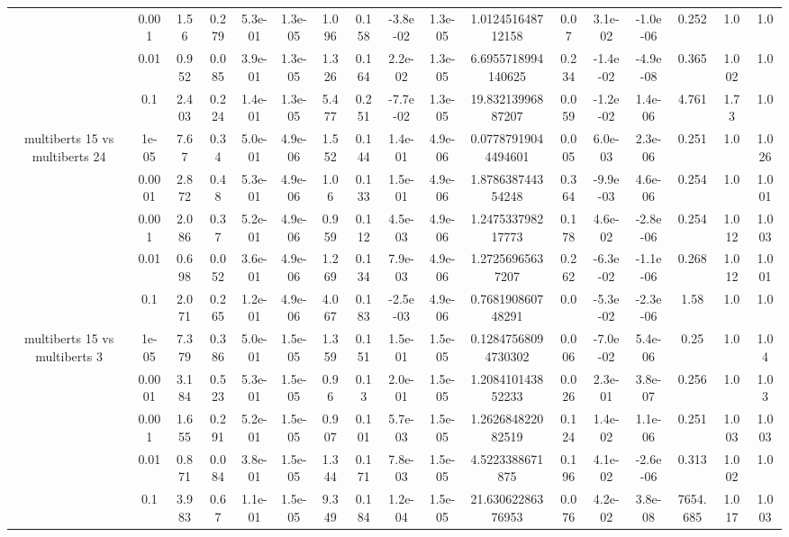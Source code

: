 \begin{tabular}{|c|c|c|c|c|c|c|c|c|c|c|c|c|c|c|c|c|}
 & 0.001 & 1.56 & 0.279 & 5.3e-01 & 1.3e-05 & 1.096 & 0.158 & -3.8e-02 & 1.3e-05 & 1.012451648712158 & 0.07 & 3.1e-02 & -1.0e-06 & 0.252 & 1.0 & 1.0 \\
 & 0.01 & 0.952 & 0.085 & 3.9e-01 & 1.3e-05 & 1.326 & 0.164 & 2.2e-02 & 1.3e-05 & 6.6955718994140625 & 0.234 & -1.4e-02 & -4.9e-08 & 0.365 & 1.002 & 1.0 \\
 & 0.1 & 2.403 & 0.224 & 1.4e-01 & 1.3e-05 & 5.477 & 0.251 & -7.7e-02 & 1.3e-05 & 19.83213996887207 & 0.059 & -1.2e-02 & 1.4e-06 & 4.761 & 1.73 & 1.0 \\
\hline
\multirow{5}{*}{multiberts 15 vs multiberts 24} & 1e-05 & 7.67 & 0.34 & 5.0e-01 & 4.9e-06 & 1.552 & 0.144 & 1.4e-01 & 4.9e-06 & 0.07787919044494601 & 0.005 & 6.0e-03 & 2.3e-06 & 0.251 & 1.0 & 1.026 \\
 & 0.0001 & 2.872 & 0.48 & 5.3e-01 & 4.9e-06 & 1.06 & 0.133 & 1.5e-01 & 4.9e-06 & 1.878638744354248 & 0.364 & -9.9e-03 & 4.6e-06 & 0.254 & 1.0 & 1.001 \\
 & 0.001 & 2.086 & 0.37 & 5.2e-01 & 4.9e-06 & 0.959 & 0.112 & 4.5e-03 & 4.9e-06 & 1.247533798217773 & 0.178 & 4.6e-02 & -2.8e-06 & 0.254 & 1.012 & 1.003 \\
 & 0.01 & 0.698 & 0.052 & 3.6e-01 & 4.9e-06 & 1.269 & 0.134 & 7.9e-03 & 4.9e-06 & 1.27256965637207 & 0.262 & -6.3e-02 & -1.1e-06 & 0.268 & 1.012 & 1.001 \\
 & 0.1 & 2.071 & 0.265 & 1.2e-01 & 4.9e-06 & 4.067 & 0.183 & -2.5e-03 & 4.9e-06 & 0.768190860748291 & 0.0 & -5.3e-02 & -2.3e-06 & 1.58 & 1.0 & 1.0 \\
\hline
\multirow{5}{*}{multiberts 15 vs multiberts 3} & 1e-05 & 7.379 & 0.386 & 5.0e-01 & 1.5e-05 & 1.359 & 0.151 & 1.5e-01 & 1.5e-05 & 0.12847568094730302 & 0.006 & -7.0e-02 & 5.4e-06 & 0.25 & 1.0 & 1.04 \\
 & 0.0001 & 3.184 & 0.523 & 5.3e-01 & 1.5e-05 & 0.96 & 0.13 & 2.0e-01 & 1.5e-05 & 1.208410143852233 & 0.026 & 2.3e-01 & 3.8e-07 & 0.256 & 1.0 & 1.03 \\
 & 0.001 & 1.655 & 0.291 & 5.2e-01 & 1.5e-05 & 0.907 & 0.101 & 5.7e-03 & 1.5e-05 & 1.262684822082519 & 0.124 & 1.4e-02 & 1.1e-06 & 0.251 & 1.003 & 1.003 \\
 & 0.01 & 0.871 & 0.084 & 3.8e-01 & 1.5e-05 & 1.344 & 0.171 & 7.8e-03 & 1.5e-05 & 4.5223388671875 & 0.196 & 4.1e-02 & -2.6e-06 & 0.313 & 1.002 & 1.0 \\
 & 0.1 & 3.983 & 0.67 & 1.1e-01 & 1.5e-05 & 9.349 & 0.184 & 1.2e-04 & 1.5e-05 & 21.63062286376953 & 0.076 & 4.2e-02 & 3.8e-08 & 7654.685 & 1.017 & 1.003 \\

\end{tabular}
